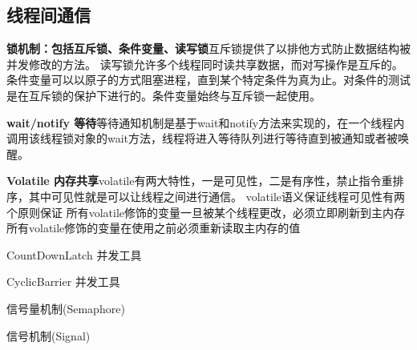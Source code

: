 \documentclass[../../../interview-questions.tex]{subfiles}
\begin{document}
\subsection{线程间通信}

\textbf{锁机制：包括互斥锁、条件变量、读写锁}互斥锁提供了以排他方式防止数据结构被并发修改的方法。 读写锁允许多个线程同时读共享数据，而对写操作是互斥的。 条件变量可以以原子的方式阻塞进程，直到某个特定条件为真为止。对条件的测试是在互斥锁的保护下进行的。条件变量始终与互斥锁一起使用。

\textbf{wait/notify 等待}等待通知机制是基于wait和notify方法来实现的，在一个线程内调用该线程锁对象的wait方法，线程将进入等待队列进行等待直到被通知或者被唤醒。

\textbf{Volatile 内存共享}volatile有两大特性，一是可见性，二是有序性，禁止指令重排序，其中可见性就是可以让线程之间进行通信。
volatile语义保证线程可见性有两个原则保证
所有volatile修饰的变量一旦被某个线程更改，必须立即刷新到主内存
所有volatile修饰的变量在使用之前必须重新读取主内存的值


CountDownLatch 并发工具

CyclicBarrier 并发工具

信号量机制(Semaphore)

信号机制(Signal)
\end{document}
